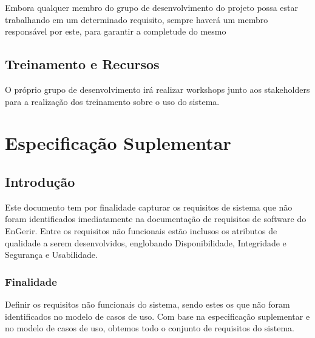 \begin{apendicesenv}
Embora qualquer membro do grupo de desenvolvimento do projeto possa estar trabalhando em um determinado requisito, sempre haverá um membro responsável por este, para garantir a completude do mesmo

\section{Treinamento e Recursos}

O próprio grupo de desenvolvimento irá realizar workshops junto aos stakeholders para a realização dos treinamento sobre o uso do sistema.





































\chapter{Especificação Suplementar}
\label{especificação_suplementar}

\section{Introdução}

Este documento tem por finalidade capturar os requisitos de sistema que não foram identificados imediatamente na documentação de requisitos de software do EnGerir. Entre os requisitos não funcionais estão inclusos os atributos de qualidade a serem desenvolvidos, englobando Disponibilidade, Integridade e Segurança e Usabilidade.

\subsection{Finalidade}

Definir os requisitos não funcionais do sistema, sendo estes os que não foram identificados no modelo de casos de uso. Com base na especificação suplementar e no modelo de casos de uso, obtemos todo o conjunto de requisitos do sistema.


\end{apendicesenv}
